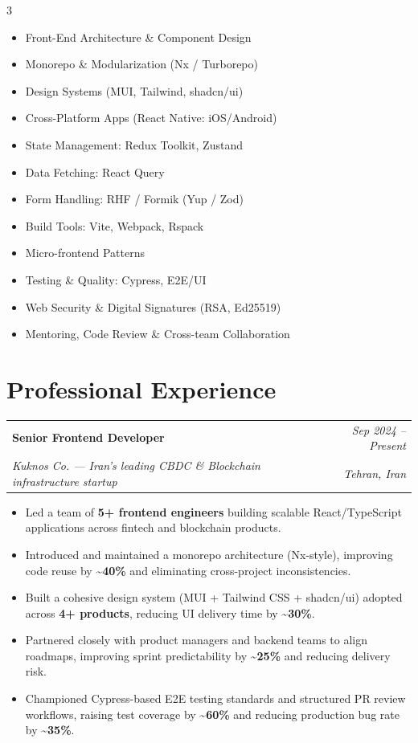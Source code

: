 \documentclass[10pt, a4paper]{article}
\makeatletter
\newcommand{\resumeEntry}[4]{%
  \noindent
  \begin{tabularx}{\textwidth}{@{}X r@{}}
    \textbf{\large #1} & \textit{\small\color{medgray}#2}\\[1pt]
    \textcolor{accent}{\textit{#3}} & \textit{\small\color{medgray}#4}
  \end{tabularx}
  \vspace{3pt}
}
\makeatother
\begin{document}
\begin{multicols}{3}
\begin{itemize}[leftmargin=*, topsep=0pt]
  \item Front-End Architecture \& Component Design
  \item Monorepo \& Modularization (Nx / Turborepo)
  \item Design Systems (MUI, Tailwind, shadcn/ui)
  \item Cross-Platform Apps (React Native: iOS/Android)
  \item State Management: Redux Toolkit, Zustand
  \item Data Fetching: React Query
  \item Form Handling: RHF / Formik (Yup / Zod)
  \item Build Tools: Vite, Webpack, Rspack
  \item Micro-frontend Patterns
  \item Testing \& Quality: Cypress, E2E/UI
  \item Web Security \& Digital Signatures (RSA, Ed25519)
  \item Mentoring, Code Review \& Cross-team Collaboration
\end{itemize}
\end{multicols}

\section{Professional Experience}

\resumeEntry{Senior Frontend Developer}{Sep 2024 -- Present}%
{Kuknos Co. \normalfont\textit{--- Iran's leading CBDC \& Blockchain infrastructure startup}}{Tehran, Iran}

\begin{itemize}
  \item Led a team of \textbf{5+ frontend engineers} building scalable React/TypeScript applications
        across fintech and blockchain products.
  \item Introduced and maintained a monorepo architecture (Nx-style), improving code reuse by
        \textbf{\textasciitilde{}40\%} and eliminating cross-project inconsistencies.
  \item Built a cohesive design system (MUI + Tailwind CSS + shadcn/ui) adopted across \textbf{4+
        products}, reducing UI delivery time by \textbf{\textasciitilde{}30\%}.
  \item Partnered closely with product managers and backend teams to align roadmaps, improving
        sprint predictability by \textbf{\textasciitilde{}25\%} and reducing delivery risk.
  \item Championed Cypress-based E2E testing standards and structured PR review workflows, raising
        test coverage by \textbf{\textasciitilde{}60\%} and reducing production bug rate by
        \textbf{\textasciitilde{}35\%}.
\end{itemize}
\end{document}
